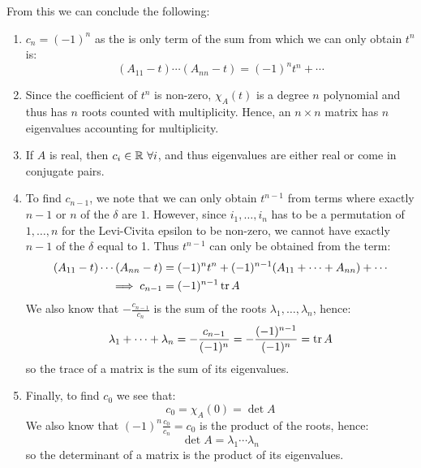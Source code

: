 \documentclass[../main.tex]{subfiles}
\begin{document}
From this we can conclude the following:
\label{eigenvalueTrDet}
\begin{enumerate}
  \item $c_n = (-1)^{n}$ as the is only term of the sum from which we can only obtain $t^{n}$ is:
    \[
      (A_{1 1} - t) \cdots (A_{n n} - t) = (-1)^{n} t^{n} + \cdots
    \]
  \item Since the coefficient of $t^{n}$ is non-zero, $\chi_A(t)$ is a degree $n$ polynomial and thus has $n$ roots counted with multiplicity.
    Hence, an $n \times n$ matrix has $n$ eigenvalues accounting for multiplicity.
  \item If $A$ is real, then $c_i \in \mathbb{R}\ \forall i$, and thus eigenvalues are either real or come in conjugate pairs.
  \item To find $c_{n - 1}$, we note that we can only obtain $t^{n - 1}$ from terms where exactly $n - 1$ or $n$ of the $\delta$ are $1$.
    However, since $i_1, \ldots, i_n$ has to be a permutation of $1, \ldots, n$ for the Levi-Civita epsilon to be non-zero, we cannot have exactly $n - 1$ of the $\delta$ equal to 1.
    Thus $t^{n - 1}$ can only be obtained from the term:
    \begin{align*}
      (A_{1 1} - t) \cdots (A_{n n} - t) &= (-1)^{n} t^{n} + (-1)^{n - 1}(A_{1 1} + \cdots + A_{n n}) + \cdots \\
      \implies c_{n - 1} &= (-1)^{n - 1} \operatorname{tr} A
    \end{align*}
    We also know that $-\frac{c_{n - 1}}{c_n}$ is the sum of the roots $\lambda_1, \ldots, \lambda_n$, hence:
    \[
      \lambda_1 + \cdots + \lambda_n = -\frac{c_{n - 1}}{(-1)^n} = -\frac{(-1)^{n - 1}}{(-1)^{n}} = \operatorname{tr} A
    \]
    so the trace of a matrix is the sum of its eigenvalues.
  \item Finally, to find $c_0$ we see that:
    \[
      c_0 = \chi_A(0) = \det A
    \]
    We also know that $(-1)^{n} \frac{c_0}{c_n} = c_0$ is the product of the roots, hence:
    \[
      \det A = \lambda_1 \cdots \lambda_n
    \]
    so the determinant of a matrix is the product of its eigenvalues.
\end{enumerate}
\end{document}
